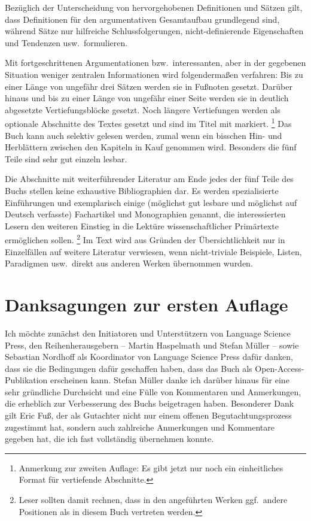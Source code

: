 Bezüglich der Unterscheidung von hervorgehobenen Definitionen und Sätzen gilt, dass Definitionen für den argumentativen Gesamtaufbau grundlegend sind, während Sätze nur hilfreiche Schlussfolgerungen, nicht-definierende Eigenschaften und Tendenzen usw.\ formulieren.

Mit fortgeschrittenen Argumentationen bzw.\ interessanten, aber in der gegebenen Situation weniger zentralen Informationen wird folgendermaßen verfahren:
Bis zu einer Länge von ungefähr drei Sätzen werden sie in Fußnoten gesetzt.
Darüber hinaus und bis zu einer Länge von ungefähr einer Seite werden sie in deutlich abgesetzte Vertiefungsblöcke gesetzt.
Noch längere Vertiefungen werden als optionale Abschnitte des Textes gesetzt und sind im Titel mit \Opsional markiert.%
\footnote{Anmerkung zur zweiten Auflage:
Es gibt jetzt nur noch ein einheitliches Format für vertiefende Abschnitte.}
Das Buch kann auch selektiv gelesen werden, zumal wenn ein bisschen Hin- und Herblättern zwischen den Kapiteln in Kauf genommen wird.
Besonders die fünf Teile sind sehr gut einzeln lesbar.

Die Abschnitte mit weiterführender Literatur am Ende jedes der fünf Teile des Buchs stellen keine exhaustive Bibliographien dar.
Es werden spezialisierte Einführungen und exemplarisch einige (möglichst gut lesbare und möglichst auf Deutsch verfasste) Fachartikel und Monographien genannt, die interessierten Lesern den weiteren Einstieg in die Lektüre wissenschaftlicher Primärtexte ermöglichen sollen.%
\footnote{Leser sollten damit rechnen, dass in den angeführten Werken ggf.\ andere Positionen als in diesem Buch vertreten werden.}
Im Text wird aus Gründen der Übersichtlichkeit nur in Einzelfällen auf weitere Literatur verwiesen, \zB wenn nicht-triviale Beispiele, Listen, Paradigmen usw.\ direkt aus anderen Werken übernommen wurden.

\section*{Danksagungen zur ersten Auflage}

Ich möchte zunächst den Initiatoren und Unterstützern von Language Science Press, den Reihenherausgebern -- Martin Haspelmath und Stefan Müller -- sowie Sebastian Nordhoff als Koordinator von Language Science Press dafür danken, dass sie die Bedingungen dafür geschaffen haben, dass das Buch als Open-Access-Publikation erscheinen kann.
Stefan Müller danke ich darüber hinaus für eine sehr gründliche Durchsicht und eine Fülle von Kommentaren und Anmerkungen, die erheblich zur Verbesserung des Buchs beigetragen haben.
Besonderer Dank gilt Eric Fuß, der als Gutachter nicht nur einem offenen Begutachtungsprozess zugestimmt hat, sondern auch zahlreiche Anmerkungen und Kommentare gegeben hat, die ich fast vollständig übernehmen konnte.

